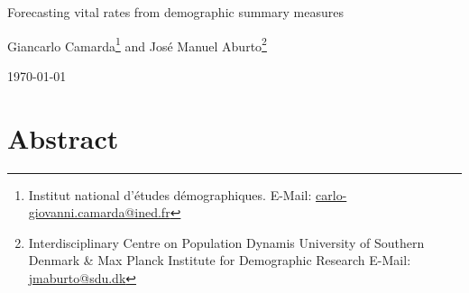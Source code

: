 \documentclass[a4paper,twoside, openright, 12pt, leqno]{article}
\begin{document}
\thispagestyle{empty}

\renewcommand{\thefootnote}{\alph{footnote}}

\hypersetup{allcolors = black, footnotecolor = black, urlcolor = blue}

\begin{center}
    
    \vspace*{.4cm}
    \LARGE{Forecasting vital rates from demographic summary measures}    
    \vspace{.4cm}
   
           
   \vspace{1cm}
    \large Giancarlo Camarda\footnote{Institut national d'\'etudes d\'emographiques.  E-Mail: \href{mailto:carlo-giovanni.camarda@ined.fr}{carlo-giovanni.camarda@ined.fr}} and Jos\'e Manuel Aburto\footnote{Interdisciplinary Centre on Population Dynamis University of Southern Denmark \& Max Planck Institute for Demographic Research  E-Mail: \href{mailto:jmaburto@sdu.dk}{jmaburto@sdu.dk}\label{SDU}} 
    
    \vspace{1cm}
    \large\today
    \vspace{1cm}
    
\end{center}

\renewcommand{\thefootnote}{\arabic{footnote}}
\setcounter{footnote}{0}

\hypersetup{allcolors = blue, footnotecolor = blue}

\section*{Abstract}


\linespread{1.5}\normalsize
\clearpage
\end{document}
